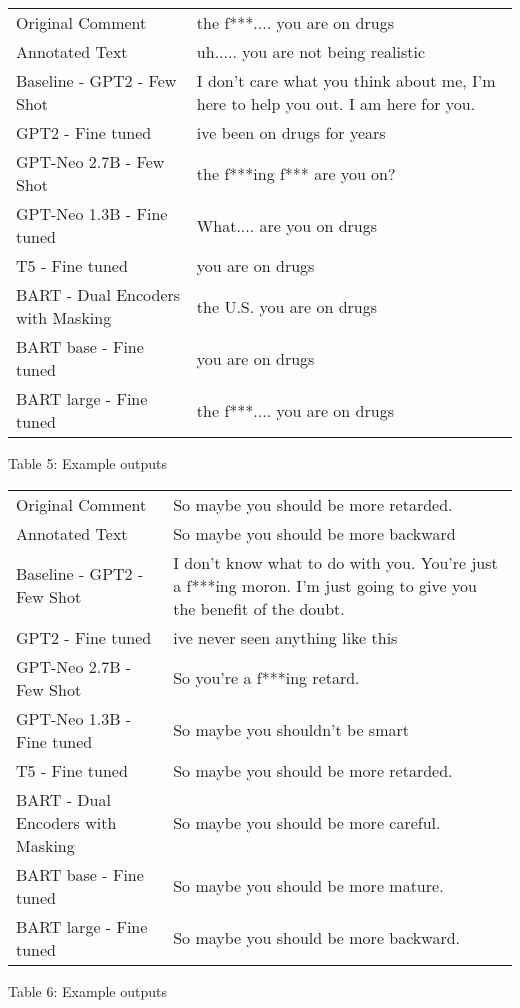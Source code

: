 \documentclass[11pt]{article}
\begin{document}
\begin{table*}[!hbt]
\centering
\small
\begin{tabularx}{\textwidth}{l|X}
\hline
 Original Comment &the f***.... you are on drugs	 \\
 Annotated Text &uh..... you are not being realistic	\\
 Baseline - GPT2 - Few Shot &I don't care what you think about me, I'm here to help you out. I am here for you. \\
GPT2 - Fine tuned &ive been on drugs for years \\
GPT-Neo 2.7B - Few Shot &the f***ing f*** are you on? \\
GPT-Neo 1.3B - Fine tuned &What.... are you on drugs \\
T5 - Fine tuned &you are on drugs \\
BART - Dual Encoders with Masking &the U.S. you are on drugs \\
BART base - Fine tuned &you are on drugs \\
BART large - Fine tuned &the f***.... you are on drugs	\\
\hline
\end{tabularx}
Table 5: Example outputs
\end{table*}


\begin{table*}[ht]
\centering
\small
\begin{tabularx}{\textwidth}{l|X}
\hline
Original Comment &So maybe you should be more retarded.\\	
Annotated Text &So maybe you should be more backward\\
Baseline - GPT2 - Few Shot &I don't know what to do with you. You're just a f***ing moron. I'm just going to give you the benefit of the doubt.\\
GPT2 - Fine tuned &ive never seen anything like this \\
GPT-Neo 2.7B - Few Shot &So you're a f***ing retard.\\
GPT-Neo 1.3B - Fine tuned &So maybe you shouldn't be smart \\
T5 - Fine tuned &So maybe you should be more retarded.\\
BART - Dual Encoders with Masking &So maybe you should be more careful.\\
BART base - Fine tuned &So maybe you should be more mature. \\
BART large - Fine tuned &So maybe you should be more backward.\\
\hline
\end{tabularx}
Table 6: Example outputs
\end{table*}
\end{document}
